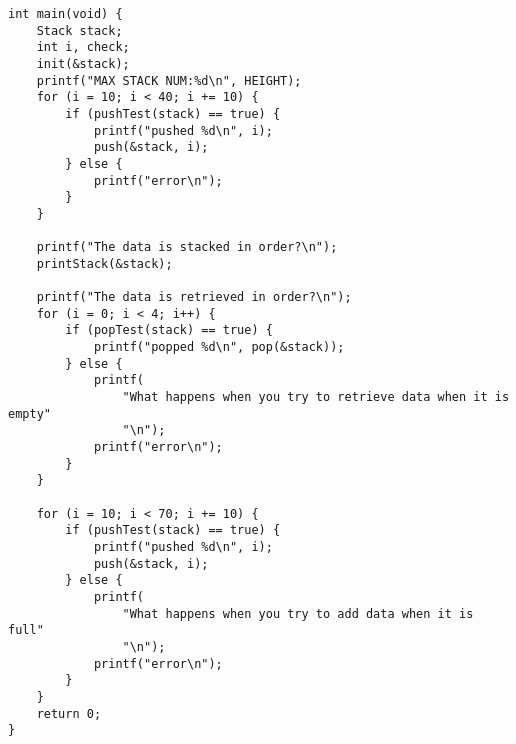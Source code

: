 \documentclass[a4j]{jarticle}
\begin{document}
\begin{lstlisting}[caption=スタックプログラム,label=stackcode]
int main(void) {
    Stack stack;
    int i, check;
    init(&stack);
    printf("MAX STACK NUM:%d\n", HEIGHT);
    for (i = 10; i < 40; i += 10) {
        if (pushTest(stack) == true) {
            printf("pushed %d\n", i);
            push(&stack, i);
        } else {
            printf("error\n");
        }
    }

    printf("The data is stacked in order?\n");
    printStack(&stack);

    printf("The data is retrieved in order?\n");
    for (i = 0; i < 4; i++) {
        if (popTest(stack) == true) {
            printf("popped %d\n", pop(&stack));
        } else {
            printf(
                "What happens when you try to retrieve data when it is empty"
                "\n");
            printf("error\n");
        }
    }

    for (i = 10; i < 70; i += 10) {
        if (pushTest(stack) == true) {
            printf("pushed %d\n", i);
            push(&stack, i);
        } else {
            printf(
                "What happens when you try to add data when it is full"
                "\n");
            printf("error\n");
        }
    }
    return 0;
}
\end{lstlisting}
\end{document}

